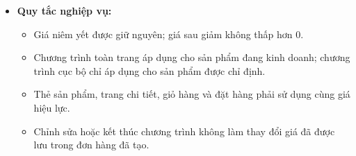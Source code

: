 \begin{itemize}
    \item \textbf{Quy tắc nghiệp vụ:}
    \begin{itemize}
        \item Giá niêm yết được giữ nguyên; giá sau giảm không thấp hơn 0.
        \item Chương trình toàn trang áp dụng cho sản phẩm đang kinh doanh; chương trình cục bộ chỉ áp dụng cho sản phẩm được chỉ định.
        \item Thẻ sản phẩm, trang chi tiết, giỏ hàng và đặt hàng phải sử dụng cùng giá hiệu lực.
        \item Chỉnh sửa hoặc kết thúc chương trình không làm thay đổi giá đã được lưu trong đơn hàng đã tạo.
    \end{itemize}
\end{itemize}

